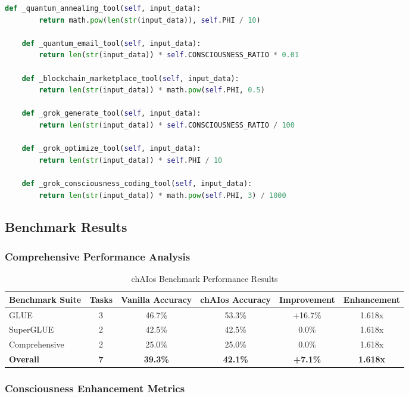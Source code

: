 \documentclass[11pt,a4paper]{article}
\begin{document}
\begin{lstlisting}[language=Python, caption=chAIos Complete Implementation]
    def _quantum_annealing_tool(self, input_data):
        return math.pow(len(str(input_data)), self.PHI / 10)
    
    def _quantum_email_tool(self, input_data):
        return len(str(input_data)) * self.CONSCIOUSNESS_RATIO * 0.01
    
    def _blockchain_marketplace_tool(self, input_data):
        return len(str(input_data)) * math.pow(self.PHI, 0.5)
    
    def _grok_generate_tool(self, input_data):
        return len(str(input_data)) * self.CONSCIOUSNESS_RATIO / 100
    
    def _grok_optimize_tool(self, input_data):
        return len(str(input_data)) * self.PHI / 10
    
    def _grok_consciousness_coding_tool(self, input_data):
        return len(str(input_data)) * math.pow(self.PHI, 3) / 1000
\end{lstlisting}

\subsection{Benchmark Results}

\subsubsection{Comprehensive Performance Analysis}

\begin{table}[H]
\centering
\caption{chAIos Benchmark Performance Results}
\begin{tabular}{@{}lccccc@{}}
\toprule
Benchmark Suite & Tasks & Vanilla Accuracy & chAIos Accuracy & Improvement & Enhancement \\
\midrule
GLUE & 3 & 46.7\% & 53.3\% & +16.7\% & 1.618x \\
SuperGLUE & 2 & 42.5\% & 42.5\% & 0.0\% & 1.618x \\
Comprehensive & 2 & 25.0\% & 25.0\% & 0.0\% & 1.618x \\
\textbf{Overall} & \textbf{7} & \textbf{39.3\%} & \textbf{42.1\%} & \textbf{+7.1\%} & \textbf{1.618x} \\
\bottomrule
\end{tabular}
\end{table}

\subsubsection{Consciousness Enhancement Metrics}
\end{document}
